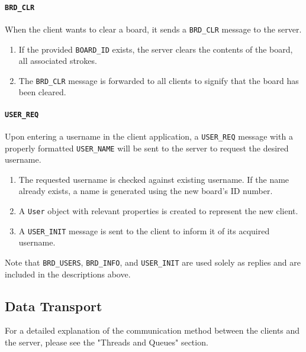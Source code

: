 \paragraph{\texttt{BRD\_CLR}} When the client wants to clear a board, it sends a \texttt{BRD\_CLR} message to the server.
\begin{enumerate}
\item If the provided \texttt{BOARD\_ID} exists, the server clears the contents of the board, all associated strokes.
\item The \texttt{BRD\_CLR} message is forwarded to all clients to signify that the board has been cleared.
\end{enumerate}

\paragraph{\texttt{USER\_REQ}} Upon entering a username in the client application, a \texttt{USER\_REQ} message with a properly formatted \texttt{USER\_NAME} will be sent to the server to request the desired username.
\begin{enumerate}
\item The requested username is checked against existing username. If the name already exists, a name is generated using the new board's ID number.
\item A \texttt{User} object with relevant properties is created to represent the new client.
\item A \texttt{USER\_INIT} message is sent to the client to inform it of its acquired username.
\end{enumerate}

Note that \texttt{BRD\_USERS}, \texttt{BRD\_INFO}, and \texttt{USER\_INIT} are used solely as replies and are included in the descriptions above.


\subsection{Data Transport}
For a detailed explanation of the communication method between the clients and the server, please see the "Threads and Queues" section.